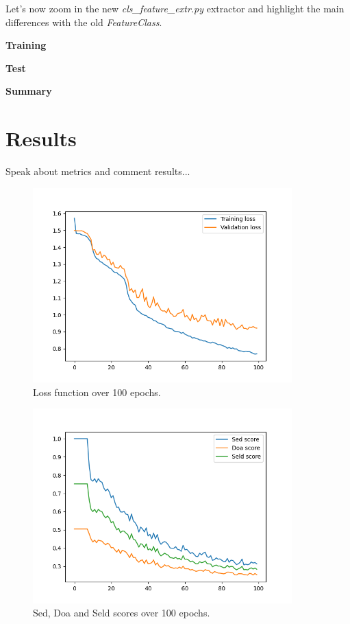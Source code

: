 \documentclass[11pt]{article}
\begin{document}
Let's now zoom in the new \textit{cls\_feature\_extr.py} extractor and highlight the main differences with the old \textit{FeatureClass}.


\newpage
\noindent\textbf{Training}

\noindent\textbf{Test}

\noindent\textbf{Summary}


\newpage
\section{Results}\label{cha:res}

Speak about metrics and comment results...

\begin{figure}[h!]
	\centering
	\includegraphics[width=10cm]{img/loss.png}
	\caption{Loss function over 100 epochs.}
	\label{fig:loss}
\end{figure}


\begin{figure}[h!]
	\centering
	\includegraphics[width=10cm]{img/scores.png}
	\caption{Sed, Doa and Seld scores over 100 epochs.}
	\label{fig:scores}
\end{figure}
\end{document}
